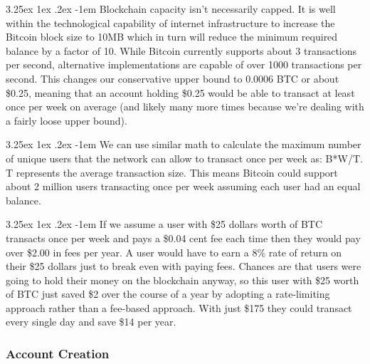 \documentclass{article}
\makeatletter
\newcounter{subsubsubsection}[subsubsection]
\renewcommand\paragraph{\@startsection{paragraph}{5}{\z@}%
  {3.25ex \@plus1ex \@minus.2ex}%
  {-1em}%
  {\normalfont\normalsize\bfseries}}
\makeatother
\begin{document}

                    \paragraph{}
                        Blockchain capacity isn't necessarily capped. It is
well within the technological capability of internet infrastructure to
increase the Bitcoin block size to 10MB which in turn will reduce the
minimum required balance by a factor of 10. While Bitcoin currently
supports about 3 transactions per second, alternative implementations are
capable of over 1000 transactions per second. This changes our conservative
upper bound to 0.0006 BTC or about \$0.25, meaning that an account holding
\$0.25 would be able to transact at least once per week on average (and
likely many more times because we're dealing with a fairly loose upper
bound).


                    \paragraph{}
                        We can use similar math to calculate the maximum
number of unique users that the network can allow to transact once per week
as: B*W/T. T represents the average transaction size. This means Bitcoin
could support about 2 million users transacting once per week assuming each
user had an equal balance.


                    \paragraph{}
                        If we assume a user with \$25 dollars worth of BTC
transacts once per week and pays a \$0.04 cent fee each time then they
would pay over \$2.00 in fees per year. A user would have to earn a 8\%
rate of return on their \$25 dollars just to break even with paying fees.
Chances are that users were going to hold their money on the blockchain
anyway, so this user with \$25 worth of BTC just saved \$2 over the course
of a year by adopting a rate-limiting approach rather than a fee-based
approach. With just \$175 they could transact every single day and save
\$14 per year.

            \subsubsection{Account Creation}
\end{document}
